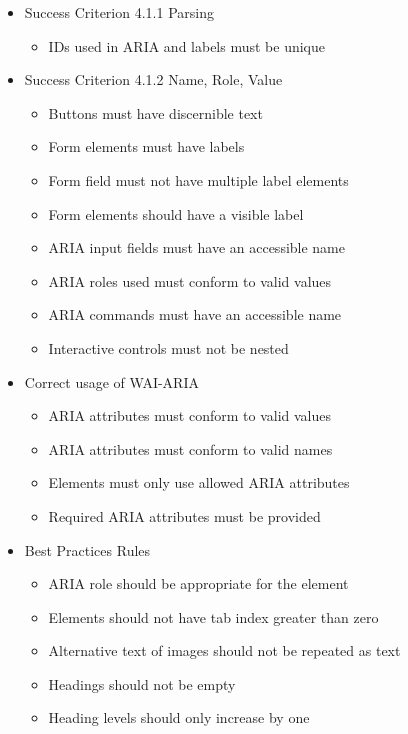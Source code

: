 \documentclass{master_thesis}
\begin{document}
\begin{itemize}
	\item Success Criterion 4.1.1 Parsing
	\begin{itemize}
		\item IDs used in ARIA and labels must be unique
	\end{itemize}

	\item Success Criterion 4.1.2 Name, Role, Value
	\begin{itemize}
		\item Buttons must have discernible text
		\item Form elements must have labels
		\item Form field must not have multiple label elements
		\item Form elements should have a visible label
		\item ARIA input fields must have an accessible name
		\item ARIA roles used must conform to valid values
		\item ARIA commands must have an accessible name
		\item Interactive controls must not be nested
	\end{itemize}

	\item Correct usage of WAI-ARIA
	\begin{itemize}
		\item ARIA attributes must conform to valid values
		\item ARIA attributes must conform to valid names
		\item Elements must only use allowed ARIA attributes
		\item Required ARIA attributes must be provided
	\end{itemize}

	\item Best Practices Rules
	\begin{itemize}
		\item ARIA role should be appropriate for the element
		\item Elements should not have tab index greater than zero
		\item Alternative text of images should not be repeated as text
		\item Headings should not be empty
		\item Heading levels should only increase by one
	\end{itemize}
\end{itemize}
\end{document}
